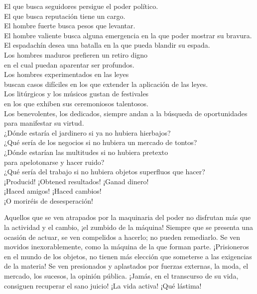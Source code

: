 \documentclass[hidelinks]{memoir}
\begin{document}
	El que busca seguidores persigue el poder político.\\
	El que busca reputación tiene un cargo.\\
	El hombre fuerte busca pesos que levantar.\\
	El hombre valiente busca alguna emergencia en la que poder mostrar su
	bravura.\\
	El espadachín desea una batalla en la que pueda blandir su espada.\\
	Los hombres maduros prefieren un retiro digno\\
	en el cual puedan aparentar ser profundos.\\
	Los hombres experimentados en las leyes\\
	buscan casos difíciles en los que extender la aplicación de las leyes.\\
	Los litúrgicos y los músicos gustan de festivales\\
	en los que exhiben sus ceremoniosos talentosos.\\
	Los benevolentes, los dedicados, siempre andan a la búsqueda de
	oportunidades\\
	para manifestar su virtud.\\
	¿Dónde estaría el jardinero si ya no hubiera hierbajos?\\
	¿Qué sería de los negocios si no hubiera un mercado de tontos?\\
	¿Dónde estarían las multitudes si no hubiera pretexto\\
	para apelotonarse y hacer ruido?\\
	¿Qué sería del trabajo si no hubiera objetos superfluos que hacer?\\
	¡Producid! ¡Obtened resultados! ¡Ganad dinero!\\
	¡Haced amigos! ¡Haced cambios!\\
	¡O moriréis de desesperación!
	
	Aquellos que se ven atrapados por la maquinaria del poder no disfrutan
	más que la actividad y el cambio, ¡el zumbido de la máquina! Siempre que
	se presenta una ocasión de actuar, se ven compelidos a hacerlo; no
	pueden remediarlo. Se ven movidos inexorablemente, como la máquina de la
	que forman parte. ¡Prisioneros en el mundo de los objetos, no tienen más
	elección que someterse a las exigencias de la materia! Se ven
	presionados y aplastados por fuerzas externas, la moda, el mercado, los
	sucesos, la opinión pública. ¡Jamás, en el transcurso de su vida,
	consiguen recuperar el sano juicio! ¡La vida activa! ¡Qué lástima!
	
\end{document}
